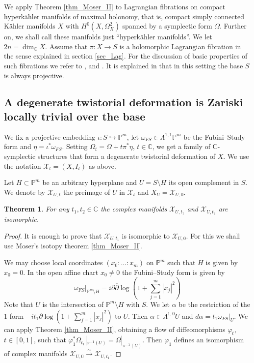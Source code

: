 \documentclass[10pt]{amsart}
\newcommand{\bbC}{\mathbb{C}}
\newcommand{\bbP}{\mathbb{P}}
\newcommand{\XX}{\mathcal{X}}
\newcommand{\dd}{\partial}
\newcommand{\ddb}{\overline\partial}
\newcommand{\ii}{i}
\newcommand{\hrarr}{\hookrightarrow}
\newtheorem{thm}[defn]{Theorem}
\begin{document}
We apply Theorem \ref{thm_Moser_II} to Lagrangian fibrations
on compact hyperk\"ahler manifolds of maximal holonomy,
that is, compact simply connected K\"ahler manifolds $X$
with $H^0(X,\Omega^2_X)$ spanned by a symplectic form $\Omega$. 
Further on, we shall call these manifolds just 
``hyperk\"ahler manifolds''. We let $2n = \dim_{\bbC} X$.
Assume that $\pi\colon X\to S$ is a holomorphic Lagrangian
fibration in the sense explained in section \ref{sec_Lag}.
For the discussion of basic properties
of such fibrations we refer to \cite{Ma1}, \cite{Ma2} and \cite{Hu1}.
It is explained in \cite[footnote on page 53]{AC} that in this setting
the base $S$ is always projective.

\subsection{A degenerate twistorial deformation is Zariski locally trivial over the base}

We fix a projective
embedding $\iota\colon S\hrarr \bbP^m$, let $\omega_{FS} \in \Lambda^{1,1}\bbP^m$ be the Fubini--Study form
and $\eta = \iota^*\omega_{FS}$.
Setting $\Omega_t = \Omega + t\pi^*\eta$, $t\in \bbC$, we get a family of C-symplectic
structures that form a degenerate twistorial deformation of $X$. We use the notation
$\XX_t = (X,I_t)$ as above.

Let $H\subset \bbP^m$ be an arbitrary hyperplane and $U = S\setminus H$
its open complement in $S$. We denote by $\XX_{U,t}$ the preimage of $U$ in $\XX_t$
and $X_U = \XX_{U,0}$.

\begin{thm}\label{thm_main}
For any $t_1, t_2\in \bbC$ the complex manifolds $\XX_{U,t_1}$ and $\XX_{U,t_2}$ are isomorphic.
\end{thm}
\begin{proof}
It is enough to prove that $\XX_{U,t_1}$ is isomorphic to $\XX_{U,0}$. For this we shall
use Moser's isotopy theorem \ref{thm_Moser_II}.

We may choose local coordinates $(x_0:\ldots :x_m)$ on $\bbP^m$ such that $H$ is given
by $x_0 = 0$. In the open affine chart $x_0 \neq 0$ the Fubini--Study form is given by
$$
\omega_{FS}|_{\bbP^m\setminus H} = \ii\dd\ddb\log\left(1+\sum_{j=1}^m |x_j|^2\right)
$$
Note that $U$ is the intersection of $\bbP^m\setminus H$ with $S$.
We let $\alpha$ be the restriction of the 1-form $- \ii t_1 \dd \log(1+\sum_{j=1}^m |x_j|^2)$
to $U$. Then $\alpha\in \Lambda^{1,0}U$ and
$d\alpha = t_1\omega_{FS}|_U$. We can apply Theorem \ref{thm_Moser_II}, obtaining
a flow of diffeomorphisms $\varphi_t$, $t\in[0,1]$, such that $\varphi_1^*\Omega_{t_1}|_{\pi^{-1}(U)} = \Omega|_{\pi^{-1}(U)}$.
Then $\varphi_1$ defines an isomorphism of complex manifolds $\XX_{U,0}\stackrel{\sim}{\to} \XX_{U,t_1}$.
\end{proof}
\end{document}

